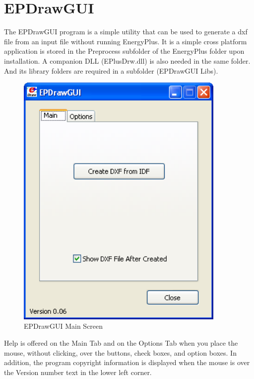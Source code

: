\chapter{EPDrawGUI}\label{epdrawgui}

The EPDrawGUI program is a simple utility that can be used to generate a dxf file from an input file without running EnergyPlus. It is a simple cross platform application is stored in the Preprocess subfolder of the EnergyPlus folder upon installation. A companion DLL (EPlusDrw.dll) is also needed in the same folder. And its library folders are required in a subfolder (EPDrawGUI Libs).

\begin{figure}[hbtp] %
\centering
\includegraphics[width=0.9\textwidth, height=0.9\textheight, keepaspectratio=true]{media/image028.png}
\caption{EPDrawGUI Main Screen \protect \label{fig:epdrawgui-main-screen}}
\end{figure}

Help is offered on the Main Tab and on the Options Tab when you place the mouse, without clicking, over the buttons, check boxes, and option boxes. In addition, the program copyright information is displayed when the mouse is over the Version number text in the lower left corner.
